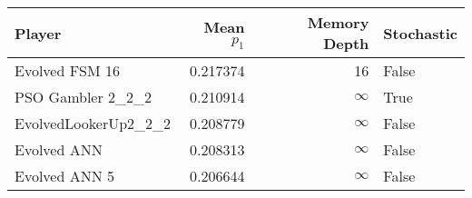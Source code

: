 \begin{tabular}{lrrl}
\toprule
               Player &  Mean $p_1$ &  Memory Depth & Stochastic \\
\midrule
       Evolved FSM 16 &    0.217374 &            16 &      False \\
    PSO Gambler 2\_2\_2 &    0.210914 &            \(\infty\) &       True \\
 EvolvedLookerUp2\_2\_2 &    0.208779 &            \(\infty\) &      False \\
          Evolved ANN &    0.208313 &            \(\infty\) &      False \\
        Evolved ANN 5 &    0.206644 &            \(\infty\) &      False \\
\bottomrule
\end{tabular}
